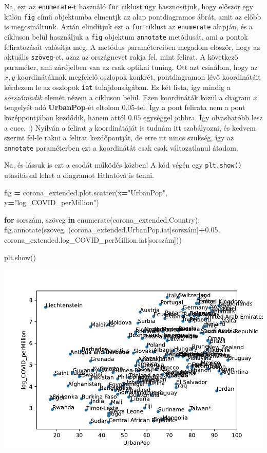 \documentclass[
]{book}
\newenvironment{Shaded}{\begin{snugshade}}{\end{snugshade}}
\newcommand{\BuiltInTok}[1]{#1}
\newcommand{\ControlFlowTok}[1]{\textcolor[rgb]{0.13,0.29,0.53}{\textbf{#1}}}
\newcommand{\FloatTok}[1]{\textcolor[rgb]{0.00,0.00,0.81}{#1}}
\newcommand{\KeywordTok}[1]{\textcolor[rgb]{0.13,0.29,0.53}{\textbf{#1}}}
\newcommand{\NormalTok}[1]{#1}
\newcommand{\OperatorTok}[1]{\textcolor[rgb]{0.81,0.36,0.00}{\textbf{#1}}}
\newcommand{\StringTok}[1]{\textcolor[rgb]{0.31,0.60,0.02}{#1}}
\begin{document}
Na, ezt az \texttt{enumerate}-t használó \texttt{for} ciklust úgy hasznosítjuk, hogy először egy külön \texttt{fig} című objektumba elmentjk az alap pontdiagramos ábrát, amit az előbb is megcsináltunk.
Aztán elindítjuk ezt a \texttt{for} ciklust az \texttt{enumerate} alapján, és a cikluson belül használjuk a \texttt{fig} objektum \texttt{annotate} metódusát, ami a pontok feliratozását valósítja meg. A metódus paramétereiben megadom először, hogy az aktuális \texttt{szöveg}-et, azaz az országnevet rakja fel, mint felirat.
A következő paraméter, ami zárójelben van az csak optikai tuning. Ott azt csinálom, hogy az \(x,y\) koordinátáknak megfelelő oszlopok konkrét, pontdiagramon lévő koordinátáit kérdezem le az oszlopok \texttt{iat} tulajdonságában. Ez két lista, így mindig a \emph{sorszámadik} elemét nézem a cikluson belül. Ezen koordináták közül a diagram \(x\) tengelyét adó \textbf{UrbanPop}-ét eltolom \(0.05\)-tel. Így a pont felirata nem a pont középpontjában kezdődik, hanem attól \(0.05\) egységgel jobbra. Így olvashatóbb lesz a cucc. :) Nyilván a felirat \(y\) koordinátáját is tudnám itt szabályozni, és kedvem szerint fel-le rakni a felirat kezdőpontját, de erre itt nincs szükség, így az \texttt{annotate} paraméterben ezt a koordinátát csak csak változatlanul átadom.

Na, és lássuk is ezt a csodát működés közben! A kód végén egy \texttt{plt.show()} utasítással lehet a diagramot láthatóvá is tenni.

\begin{Shaded}
\begin{Highlighting}[]
\NormalTok{fig }\OperatorTok{=}\NormalTok{ corona\_extended.plot.scatter(x}\OperatorTok{=}\StringTok{"UrbanPop"}\NormalTok{, y}\OperatorTok{=}\StringTok{"log\_COVID\_perMillion"}\NormalTok{)}

\ControlFlowTok{for}\NormalTok{ sorszám, szöveg }\KeywordTok{in} \BuiltInTok{enumerate}\NormalTok{(corona\_extended.Country):}
\NormalTok{   fig.annotate(szöveg, (corona\_extended.UrbanPop.iat[sorszám]}\OperatorTok{+}\FloatTok{0.05}\NormalTok{, corona\_extended.log\_COVID\_perMillion.iat[sorszám]))}

\NormalTok{plt.show()}
\end{Highlighting}
\end{Shaded}

\includegraphics{_main_files/figure-latex/unnamed-chunk-133-25.pdf}
\end{document}
